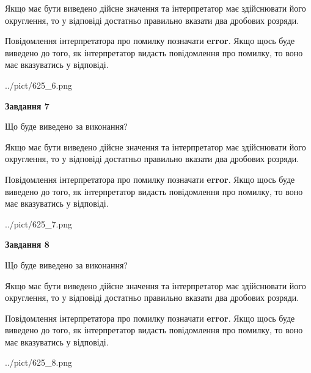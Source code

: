 \documentclass[12pt, ukrainian]{article}
\begin{document}
{\begin {Large}
Якщо має бути виведено дійсне значення та інтерпретатор має здійснювати його округлення, 
то у відповіді достатньо правильно вказати два дробових розряди.

Повідомлення інтерпретатора про помилку позначати \textbf{error}.
Якщо щось буде виведено до того, як інтерпретатор видасть повідомлення про помилку, 
то воно має вказуватись у відповіді. \par

\begin{center}
	{../pict/625_6.png}
\end{center}
\newpage

{\begin {center}\textbf{Завдання 7}\end {center}}\par
Що буде виведено за виконання? \par

Якщо має бути виведено дійсне значення та інтерпретатор має здійснювати його округлення, 
то у відповіді достатньо правильно вказати два дробових розряди.

Повідомлення інтерпретатора про помилку позначати \textbf{error}.
Якщо щось буде виведено до того, як інтерпретатор видасть повідомлення про помилку, 
то воно має вказуватись у відповіді. \par

\begin{center}
	{../pict/625_7.png}
\end{center}
\newpage

{\begin {center}\textbf{Завдання 8}\end {center}}\par
Що буде виведено за виконання? \par

Якщо має бути виведено дійсне значення та інтерпретатор має здійснювати його округлення, 
то у відповіді достатньо правильно вказати два дробових розряди.

Повідомлення інтерпретатора про помилку позначати \textbf{error}.
Якщо щось буде виведено до того, як інтерпретатор видасть повідомлення про помилку, 
то воно має вказуватись у відповіді. \par

\begin{center}
	{../pict/625_8.png}
\end{center}
\newpage


\end{Large}}
\end{document}
